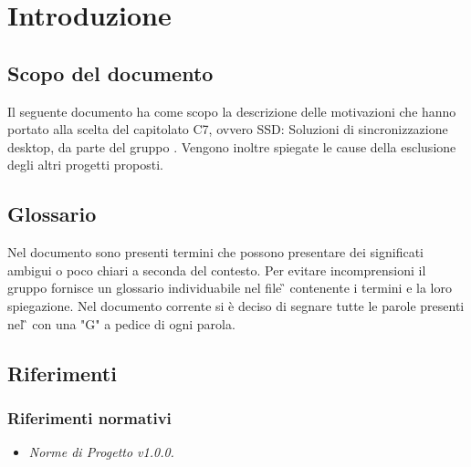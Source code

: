 \section{Introduzione}

\subsection{Scopo del documento}
Il seguente documento ha come scopo la descrizione delle motivazioni che hanno
portato alla scelta del capitolato C7, ovvero SSD: Soluzioni di sincronizzazione desktop, da parte del gruppo \gruppo{}. Vengono inoltre spiegate le cause della esclusione degli altri progetti proposti.

\subsection{Glossario}
Nel documento sono presenti termini che possono presentare dei significati ambigui o poco chiari a seconda del contesto.
Per evitare incomprensioni il gruppo fornisce un glossario individuabile nel file \G{} \versGlo{} contenente i termini e la loro spiegazione.\newline{}
Nel documento corrente si è deciso di segnare tutte le parole presenti nel \G{} con una "G" a pedice di ogni parola.

\subsection{Riferimenti}

\subsubsection{Riferimenti normativi}
\begin{itemize}
\item \textit{Norme di Progetto v1.0.0.}
\end{itemize}

